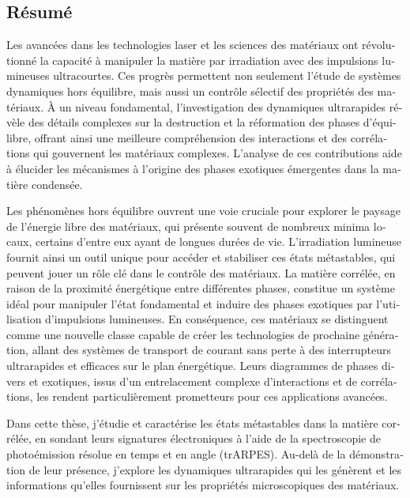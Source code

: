 \begin{otherlanguage}{french}
\cleardoublepage
\chapter*{Résumé}

Les avancées dans les technologies laser et les sciences des matériaux ont révolutionné la capacité à manipuler la matière par irradiation avec des impulsions lumineuses ultracourtes.
Ces progrès permettent non seulement l’étude de systèmes dynamiques hors équilibre, mais aussi un contrôle sélectif des propriétés des matériaux.
À un niveau fondamental, l’investigation des dynamiques ultrarapides révèle des détails complexes sur la destruction et la réformation des phases d’équilibre, offrant ainsi une meilleure compréhension des interactions et des corrélations qui gouvernent les matériaux complexes.
L’analyse de ces contributions aide à élucider les mécanismes à l’origine des phases exotiques émergentes dans la matière condensée. 

Les phénomènes hors équilibre ouvrent une voie cruciale pour explorer le paysage de l’énergie libre des matériaux, qui présente souvent de nombreux minima locaux, certains d’entre eux ayant de longues durées de vie.
L’irradiation lumineuse fournit ainsi un outil unique pour accéder et stabiliser ces états métastables, qui peuvent jouer un rôle clé dans le contrôle des matériaux. La matière corrélée, en raison de la proximité énergétique entre différentes phases, constitue un système idéal pour manipuler l’état fondamental et induire des phases exotiques par l’utilisation d’impulsions lumineuses.
En conséquence, ces matériaux se distinguent comme une nouvelle classe capable de créer les technologies de prochaine génération, allant des systèmes de transport de courant sans perte à des interrupteurs ultrarapides et efficaces sur le plan énergétique.
Leurs diagrammes de phases divers et exotiques, issus d’un entrelacement complexe d’interactions et de corrélations, les rendent particulièrement prometteurs pour ces applications avancées. \hfill\break

Dans cette thèse, j’étudie et caractérise les états métastables dans la matière corrélée, en sondant leurs signatures électroniques à l’aide de la spectroscopie de photoémission résolue en temps et en angle (trARPES).
Au-delà de la démonstration de leur présence, j’explore les dynamiques ultrarapides qui les génèrent et les informations qu’elles fournissent sur les propriétés microscopiques des matériaux. \hfill\break


\end{otherlanguage}
